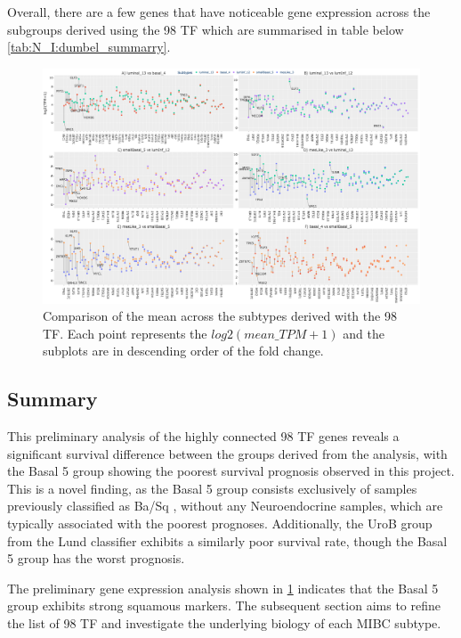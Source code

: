 Overall, there are a few genes that have noticeable gene expression across the subgroups derived using the 98 TF which are summarised in table below \cref{tab:N_I:dumbel_summarry}.

\begin{figure}

    \centering
    \includegraphics[width=1.0\textwidth,keepaspectratio]{Sections/Network_I/Resources/selective_pruning/dumbell_sel_tfs.png}
      \caption[Mean gene expression acros the five MIBC subgrouos]{Comparison of the mean across the subtypes derived with the 98 TF. Each point represents the $log2(mean\_TPM+1)$ and the subplots are in descending order of the fold change.}
    \label{fig:N_I:dumbell_sel_tfs}
\end{figure}


\subsection{Summary}

This preliminary analysis of the highly connected 98 TF genes reveals a significant survival difference between the groups derived from the analysis, with the Basal 5 group showing the poorest survival prognosis observed in this project. This is a novel finding, as the Basal 5 group consists exclusively of samples previously classified as Ba/Sq \citep{Kamoun2020-tj,Robertson2017-mg}, without any Neuroendocrine samples, which are typically associated with the poorest prognoses. Additionally, the UroB group from the Lund classifier \citep{Marzouka2018-ge} exhibits a similarly poor survival rate, though the Basal 5 group has the worst prognosis.

The preliminary gene expression analysis shown in \cref{fig:N_I:dumbell_sel_tfs} indicates that the Basal 5 group exhibits strong squamous markers. The subsequent section aims to refine the list of 98 TF and investigate the underlying biology of each MIBC subtype.




